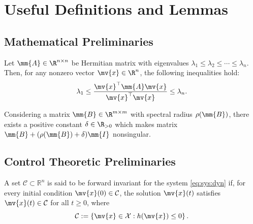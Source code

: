 
\chapter{Useful Definitions and Lemmas}

\section{Mathematical Preliminaries}

\begin{lem}
    Let $\mm{A} \in \R^{n \times n}$ be Hermitian matrix with eigenvalues $\lambda_1 \leq \lambda_2 \leq \cdots \leq \lambda_n$.
    Then, for any nonzero vector $\mv{x} \in \R^n$, the following inequalities hold:
    \begin{equation}
        \lambda_1 \leq \frac{\mv{x}^\top \mm{A} \mv{x}}{\mv{x}^\top \mv{x}} \leq \lambda_n
        .
    \end{equation}
\end{lem}

\begin{lem}
    \label{appx:lem:spectral:radius}
    Considering a matrix $\mm{B}\in\R^{m\times m}$ with spectral radius $\rho(\mm{B})$, there exists a positive constant $\delta\in\R_{>0}$ which makes matrix $\mm{B}+(\rho(\mm{B})+\delta)\mm{I}$ nonsingular.
\end{lem}

\section{Control Theoretic Preliminaries}

\begin{definition} \label{appx:def:forward:invariant}
    A set $\mathcal{C} \subset \mathbb{R}^n$ is said to be forward invariant for the system \eqref{eq:sys:dyn} if, for every initial condition $\mv{x}(0) \in \mathcal{C}$, the solution $\mv{x}(t)$ satisfies $\mv{x}(t) \in \mathcal{C}$ for all $t \ge 0$, where 
    \begin{equation}
        \mathcal{C} := 
        \left\{
            \mv{x} \in \mathcal{X} : h(\mv{x}) \le 0
        \right\}
        .
    \end{equation}
\end{definition}

